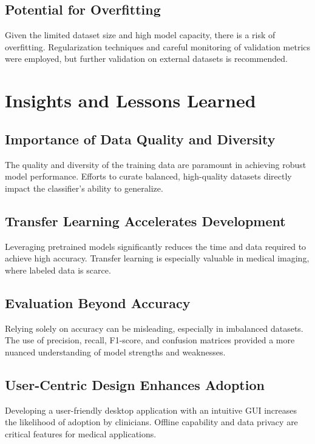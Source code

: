 \documentclass[a4paper,12pt]{report}
\begin{document}
\begin{spacing}{1.5}
        \subsection*{Potential for Overfitting}
        Given the limited dataset size and high model capacity, there is a risk of overfitting. Regularization techniques and careful monitoring of validation metrics were employed, but further validation on external datasets is recommended.
    
    \newpage

    \section{Insights and Lessons Learned}
    
        \subsection*{Importance of Data Quality and Diversity}
        The quality and diversity of the training data are paramount in achieving robust model performance. Efforts to curate balanced, high-quality datasets directly impact the classifier’s ability to generalize.
        
        \subsection*{Transfer Learning Accelerates Development}
        Leveraging pretrained models significantly reduces the time and data required to achieve high accuracy. Transfer learning is especially valuable in medical imaging, where labeled data is scarce.
        
        \subsection*{Evaluation Beyond Accuracy}
        Relying solely on accuracy can be misleading, especially in imbalanced datasets. The use of precision, recall, F1-score, and confusion matrices provided a more nuanced understanding of model strengths and weaknesses.
        
        \subsection*{User-Centric Design Enhances Adoption}
        Developing a user-friendly desktop application with an intuitive GUI increases the likelihood of adoption by clinicians. Offline capability and data privacy are critical features for medical applications.
        

\end{spacing}
\end{document}
